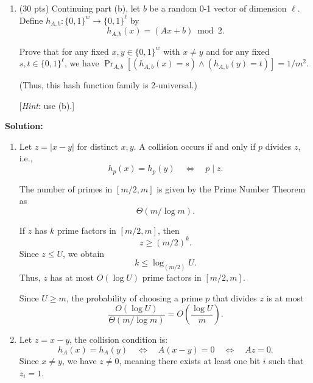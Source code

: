 \documentclass[11pt]{article}
\begin{document}
\begin{description}
\begin{enumerate}
\medskip
\item[(c)] (30 pts)
Continuing part (b), let $b$ be a random 0-1 vector of dimension $\ell$.
Define $h_{A,b} : \{0,1\}^w \rightarrow \{0,1\}^\ell$ by
\[ h_{A,b}(x) = (Ax+b) \bmod 2. \]

Prove that for any fixed $x,y\in\{0,1\}^w$ with $x\neq y$ and for
any fixed $s,t\in \{0,1\}^\ell$,
we have $\Pr_{A,b}[(h_{A,b}(x)=s) \wedge (h_{A,b}(y)=t)] = 1/m^2$.

(Thus, this hash function family is 2-universal.) 

[\emph{Hint}: use (b).]
\end{enumerate}

\newpage
\textbf{Solution:}
\begin{enumerate}
  \item[(a)] 
    Let $ z = |x - y| $ for distinct $ x, y $. 
    A collision occurs if and only if $ p $ divides $ z $, i.e., 
    \begin{equation}
      h_p(x) = h_p(y) \quad \Leftrightarrow \quad p \mid z.
    \end{equation}
    
    The number of primes in $ [m/2, m] $ is given by the Prime Number Theorem as 
    \begin{equation}
      \Theta(m / \log m).
    \end{equation}
    
    If $ z $ has $ k $ prime factors in $ [m/2, m] $, then 
    \begin{equation}
      z \geq (m/2)^k.
    \end{equation}
    Since $ z \leq U $, we obtain
    \begin{equation}
      k \leq \log_{(m/2)} U.
    \end{equation}
    Thus, $ z $ has at most $ O(\log U) $ prime factors in $ [m/2, m] $.

    Since $ U \ge m $, the probability of choosing a prime $ p $ 
    that divides $ z $ is at most
    \begin{equation}
      \frac{O(\log U)}{\Theta(m / \log m)} = O\left(\frac{\log U}{m}\right).
    \end{equation}
  
  \item[(b)] 
    Let $ z = x - y $, the collision condition is:
    \begin{equation}
      h_A(x) = h_A(y) \quad \Leftrightarrow \quad A(x - y) = 0 \quad \Leftrightarrow \quad A z = 0.
    \end{equation}
    Since $ x \neq y $, we have $ z \neq 0 $, 
    meaning there exists at least one bit $ i $ 
    such that $ z_i = 1 $.


\end{enumerate}
\end{description}
\end{document}
